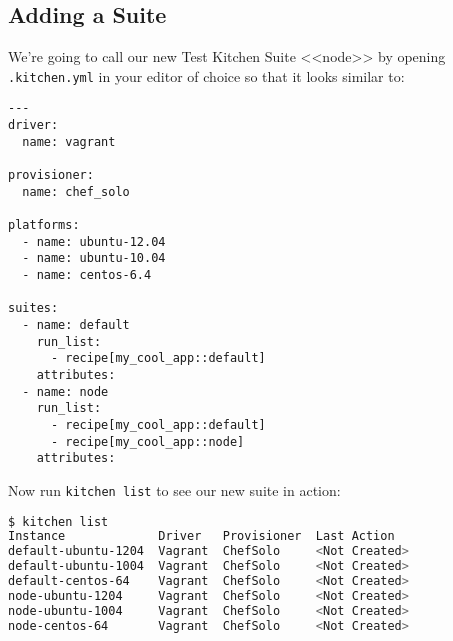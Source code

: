 \subsection{Adding a Suite}

We're going to call our new Test Kitchen Suite <<node>> by opening \lstinline!.kitchen.yml! in your editor of choice so that it looks similar to:

\begin{lstlisting}[label=lst:testing-test-kitchen34]
---
driver:
  name: vagrant

provisioner:
  name: chef_solo

platforms:
  - name: ubuntu-12.04
  - name: ubuntu-10.04
  - name: centos-6.4

suites:
  - name: default
    run_list:
      - recipe[my_cool_app::default]
    attributes:
  - name: node
    run_list:
      - recipe[my_cool_app::default]
      - recipe[my_cool_app::node]
    attributes:
\end{lstlisting}

Now run \lstinline!kitchen list! to see our new suite in action:

\begin{lstlisting}[language=Bash,label=lst:testing-test-kitchen35]
$ kitchen list
Instance             Driver   Provisioner  Last Action
default-ubuntu-1204  Vagrant  ChefSolo     <Not Created>
default-ubuntu-1004  Vagrant  ChefSolo     <Not Created>
default-centos-64    Vagrant  ChefSolo     <Not Created>
node-ubuntu-1204     Vagrant  ChefSolo     <Not Created>
node-ubuntu-1004     Vagrant  ChefSolo     <Not Created>
node-centos-64       Vagrant  ChefSolo     <Not Created>
\end{lstlisting}
